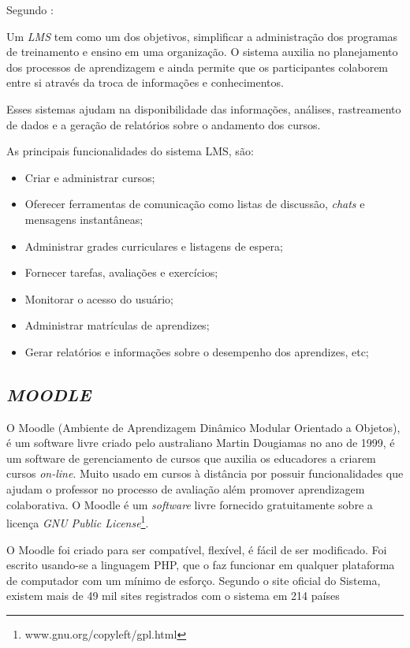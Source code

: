 Segundo :
\begin{citacao}
  Um \textit{LMS} tem como um dos objetivos, simplificar a administração dos programas de treinamento e ensino em uma organização. O sistema auxilia no planejamento dos processos de aprendizagem e ainda permite que os participantes colaborem entre si através da troca de informações e conhecimentos.
\end{citacao}

Esses sistemas ajudam na disponibilidade das informações, análises, rastreamento de dados e a geração de relatórios sobre o andamento dos cursos.

As principais funcionalidades do sistema \ac{LMS}, são:
\begin{itemize}
  \item Criar e administrar cursos;
  \item Oferecer ferramentas de comunicação como listas de discussão, \textit{chats} e mensagens instantâneas;
  \item Administrar grades curriculares e listagens de espera;
  \item Fornecer tarefas, avaliações e exercícios;
  \item Monitorar o acesso do usuário;
  \item Administrar matrículas de aprendizes;
  \item Gerar relatórios e informações sobre o desempenho dos aprendizes, etc;
\end{itemize}

\subsection{\textit{MOODLE}}
O \ac{Moodle} (Ambiente de Aprendizagem Dinâmico Modular Orientado a Objetos), é um software livre criado pelo australiano Martin Dougiamas no ano de 1999, é um software de gerenciamento de cursos que auxilia os educadores a criarem cursos \textit{on-line}. Muito usado em cursos à distância por possuir funcionalidades que ajudam o professor no processo de avaliação além promover aprendizagem colaborativa. O \ac{Moodle} é um \textit{software} livre fornecido gratuitamente sobre a licença \textit{GNU Public License}\footnote{www.gnu.org/copyleft/gpl.html}. \cite{moodle}

O \ac{Moodle} foi criado para ser compatível, flexível, é fácil de ser modificado. Foi escrito usando-se a linguagem \ac{PHP}, que o faz funcionar em qualquer plataforma de computador com um mínimo de esforço. Segundo o site oficial do Sistema, existem mais de 49 mil sites registrados com o sistema em 214 países \cite{moodle-stats}

